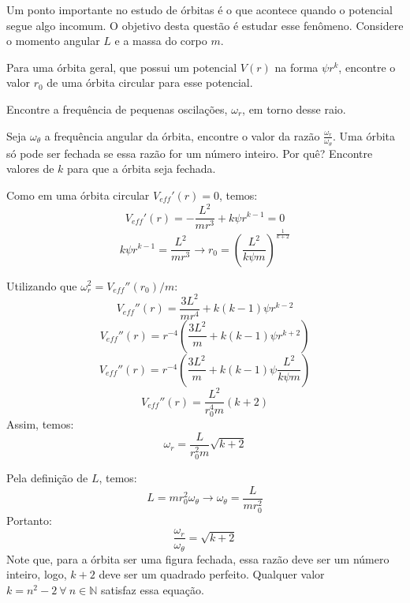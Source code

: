 \documentclass[11pt]{article}
\begin{document}
\begin{pproblem} Um ponto importante no estudo de órbitas é o que acontece quando o potencial segue algo incomum. O objetivo desta questão é estudar esse fenômeno. Considere o momento angular \(L\) e a massa do corpo \(m\).
    \begin{alternativas}
        \item Para uma órbita geral, que possui um potencial \(V(r)\) na forma \(\psi r^k\), encontre o valor \(r_0\) de uma órbita circular para esse potencial.
        
        \item Encontre a frequência de pequenas oscilações, \(\omega_r\), em torno desse raio. 
        
        \item Seja \(\omega_\theta\) a frequência angular da órbita, encontre o valor da razão \(\frac{\omega_r}{\omega_\theta}\). Uma órbita só pode ser fechada se essa razão for um número inteiro. Por quê? Encontre valores de \(k\) para que a órbita seja fechada.
         
    \end{alternativas} 

    \begin{pssolution*}{}{}
        \begin{alternativas}
            \item Como em uma órbita circular \(V_{eff}'(r) = 0\), temos:
            \[V_{eff}'(r) = -\frac{L^2}{mr^3}+k\psi r^{k-1} = 0\]
            \[k\psi r^{k-1} = \frac{L^2}{mr^3} \rightarrow \boxed{r_0 = \left(\frac{L^2}{k\psi m}\right)^{\frac{1}{k+2}}}\]
        
            \item Utilizando que \(\omega_r^2=V_{eff}''(r_0)/m\):
            \[V_{eff}''(r) = \frac{3L^2}{mr^4}+k(k-1)\psi r^{k-2}\]
            \[V_{eff}''(r) = r^{-4}\left(\frac{3L^2}{m}+k(k-1)\psi r^{k+2}\right)\]
            \[V_{eff}''(r) = r^{-4}\left(\frac{3L^2}{m}+k(k-1)\psi \frac{L^2}{k\psi m}\right)\]
            \[V_{eff}''(r) = \frac{L^2}{r_0^4m}(k+2)\]
            Assim, temos:
            \[\boxed{\omega_r = \frac{L}{r_0^2m}\sqrt{k+2}}\]

            \item Pela definição de \(L\), temos:
            \[L = mr_0^2\omega_\theta \rightarrow \omega_\theta = \frac{L}{mr_0^2}\]
            Portanto:
            \[\frac{\omega_r}{\omega_\theta} = \sqrt{k+2}\]
            Note que, para a órbita ser uma figura fechada, essa razão deve ser um número inteiro, logo, \(k+2\) deve ser um quadrado perfeito. Qualquer valor \(k = n^2-2 \ \forall \ n \in \mathbb{N}\) satisfaz essa equação.
        \end{alternativas}
    \end{pssolution*}
\end{pproblem}
\end{document}
